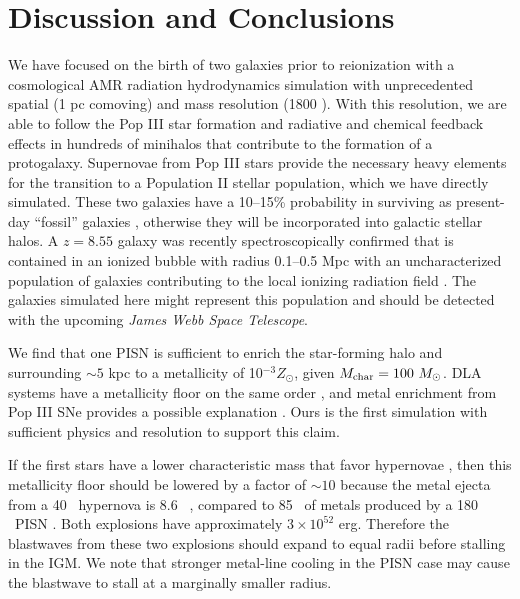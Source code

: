 \documentclass[12pt,preprint]{aastex}
\begin{document}
\section{Discussion and Conclusions}
\label{sec:discuss}

We have focused on the birth of two galaxies prior to reionization
with a cosmological AMR radiation hydrodynamics simulation with
unprecedented spatial (1 pc comoving) and mass resolution (1800 \Ms).
With this resolution, we are able to follow the Pop III star formation
and radiative and chemical feedback effects in hundreds of minihalos
that contribute to the formation of a protogalaxy.  Supernovae from
Pop III stars provide the necessary heavy elements for the transition
to a Population II stellar population, which we have directly
simulated.  These two galaxies have a 10--15\% probability in
surviving as present-day ``fossil'' galaxies \citep{Gnedin06},
otherwise they will be incorporated into galactic stellar halos.  A
$z=8.55$ galaxy was recently spectroscopically confirmed that is
contained in an ionized bubble with radius 0.1--0.5 Mpc with an
uncharacterized population of galaxies contributing to the local
ionizing radiation field \citep{Lehnert10_z8.6}.  The galaxies
simulated here might represent this population and should be detected
with the upcoming \textit{James Webb Space Telescope}.

We find that one PISN is sufficient to enrich the star-forming halo
and surrounding $\sim 5$ kpc to a metallicity of 10$^{-3} Z_\odot$,
given $M_{\rm char} = 100~\Ms$.  DLA systems have a metallicity floor
on the same order \citep{Wolfe05_Review, Penprase10}, and metal
enrichment from Pop III SNe provides a possible explanation
\citep{Kobayashi11}.  Ours is the first simulation with sufficient
physics and resolution to support this claim.

If the first stars have a lower characteristic mass that favor
hypernovae \citep{Tumlinson07_IMF}, then this metallicity floor should
be lowered by a factor of $\sim 10$ because the metal ejecta from a 40
\Ms~hypernova is 8.6 \Ms~\citep{Nomoto06}, compared to 85 \Ms~of
metals produced by a 180 \Ms~PISN \citep{Heger02}.  Both explosions
have approximately $3 \times 10^{52}$ erg.  Therefore the blastwaves
from these two explosions should expand to equal radii before stalling
in the IGM.  We note that stronger metal-line cooling in the PISN case
may cause the blastwave to stall at a marginally smaller radius.  
\end{document}
